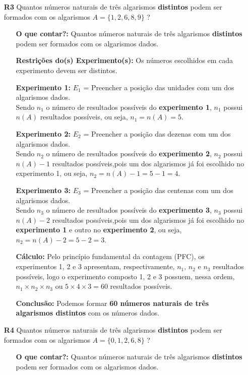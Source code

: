 \documentclass[a4paper,12pt]{article}
\begin{document}
\begin{enumerate}
\item[\textbf{R3}] Quantos números naturais de três algarismos \textbf{distintos} podem ser formados com os algarismos $A = \{1, 2, 6, 8, 9\}$ ?
   \begin{itemize}
    \item[\ding{172}] \textbf{O que contar?:} Quantos números naturais de três algarismos \textbf{distintos} podem ser formados com os algarismos dados.
    \item[\ding{173}] \textbf{Restrições do(s) Experimento(s):} Os números escolhidos em cada experimento devem ser distintos.
    \item[\ding{174}] \textbf{Experimento 1:} $E_1$ = Preencher a posição das unidades com um dos algarismos dados.\\ Sendo $n_{1}$ o número de resultados possíveis do \textbf{experimento 1}, $n_{1}$ possui $n(A)$ resultados possíveis, ou seja, $n_{1} = n(A) = 5$.
    \item[\ding{175}] \textbf{Experimento 2:} $E_2$ = Preencher a posição das dezenas com um dos algarismos dados.\\ Sendo $n_{2}$ o número de resultados possíveis do \textbf{experimento 2}, $n_{2}$ possui $n(A)-1$ resultados possíveis,pois um dos algarismos já foi escolhido no experimento 1, ou seja, $n_{2} = n(A)-1 = 5 - 1 = 4$.
    \item[\ding{176}] \textbf{Experimento 3:} $E_3$ = Preencher a posição das centenas com um dos algarismos dados.\\ Sendo $n_{3}$ o número de resultados possíveis do \textbf{experimento 3}, $n_{3}$ possui $n(A)-2$ resultados possíveis,pois um dos algarismos já foi escolhido no \textbf{experimento 1} e outro no \textbf{experimento 2}, ou seja, $n_{2} = n(A) - 2 = 5 - 2 = 3$.   
    \item[\ding{177}] \textbf{Cálculo:} Pelo princípio fundamental da contagem (PFC), os experimentos 1, 2 e 3 apresentam, respectivamente, $n_{1},\, n_{2} \textrm{ e } n_{3}$ resultados possíveis, logo o experimento composto 1, 2 e 3 possuem, nessa ordem, $n_{1} \times n_{2} \times n_{3}$ ou $5 \times 4 \times 3 = 60$ resultados possíveis.
    \item[\ding{178}] \textbf{Conclusão:} Podemos formar \textbf{60 números naturais de três algarismos distintos} com os números dados.
  \end{itemize}
  
\item[\textbf{R4}] Quantos números naturais de três algarismos \textbf{distintos} podem ser formados com os algarismos $A = \{0, 1, 2, 6, 8\}$ ?
   \begin{itemize}
    \item[\ding{172}] \textbf{O que contar?:} Quantos números naturais de três algarismos \textbf{distintos} podem ser formados com os algarismos dados.
    

\end{itemize}
\end{enumerate}
\end{document}
